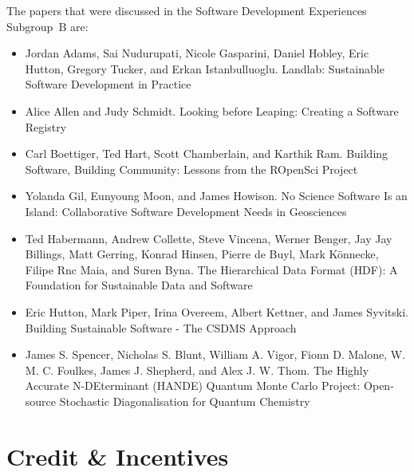 \documentclass[11pt, oneside]{amsart}
\newcommand{\todo}[1]{{\color{blue}$\blacksquare$~\textsf{[TODO: #1]}}}
\begin{document}
The papers that were discussed in the Software Development Experiences Subgroup~B are:

\begin{itemize}

\item Jordan Adams, Sai Nudurupati, Nicole Gasparini, Daniel Hobley, Eric
Hutton, Gregory Tucker, and Erkan Istanbulluoglu. Landlab: Sustainable Software
Development in Practice ~\cite{wssspe2_adams}

\item Alice Allen and Judy Schmidt. Looking before Leaping: Creating a Software
Registry~\cite{wssspe2_allen}

\item Carl Boettiger, Ted Hart, Scott Chamberlain, and Karthik Ram. Building
Software, Building Community: Lessons from the {ROpenSci} Project~\cite{wssspe2_boettiger}

\item Yolanda Gil, Eunyoung Moon, and James Howison. No Science Software Is an
Island: Collaborative Software Development Needs in
Geosciences~\cite{wssspe2_gil}

\item Ted Habermann, Andrew Collette, Steve Vincena, Werner Benger, Jay Jay
Billings, Matt Gerring, Konrad Hinsen, Pierre de Buyl, Mark K\"{o}nnecke, Filipe
Rnc Maia, and Suren Byna. The Hierarchical Data Format ({HDF}): A Foundation for
Sustainable Data and Software~\cite{wssspe2_habermann}

\item Eric Hutton, Mark Piper, Irina Overeem, Albert Kettner, and James Syvitski.
Building Sustainable Software - The {CSDMS} Approach~\cite{wssspe2_hutton}

\item James S. Spencer, Nicholas S. Blunt, William A. Vigor, Fionn D. Malone, W.
M. C. Foulkes, James J. Shepherd, and Alex J. W. Thom. The {H}ighly {A}ccurate
{N-DE}terminant ({HANDE}) Quantum {Monte Carlo} Project: Open-source Stochastic
Diagonalisation for Quantum Chemistry~\cite{wssspe2_spencer}
\end{itemize}

\section{Credit \& Incentives} \label{sec:credit}
\end{document}
